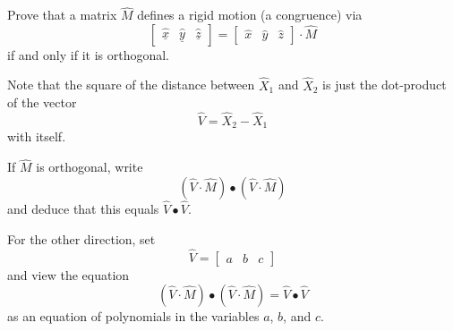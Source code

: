 \documentclass{ximera}
\begin{document}
\begin{problem}
  Prove that a matrix $\hat{M}$ defines a rigid motion (a congruence)
  via
  \[
\begin{bmatrix}
\underline{\hat{x}} & \underline{\hat{y}} & \underline{\hat{z}}%
\end{bmatrix}
=
\begin{bmatrix} \hat{x} & \hat{y} & \hat{z}%
\end{bmatrix}
\cdot\hat{M}
  \]
  if and only if it is orthogonal.

  \begin{hint}
    Note that the square of the distance between $\hat{X}_{1}$ and
    $\hat{X}_{2}$ is just the dot-product of the vector%
    \[
    \hat{V}=\hat{X}_{2}-\hat{X}_{1}%
    \]
    with itself. 
  \end{hint}
  \begin{hint}
    If $\hat{M}$ is orthogonal, write
    \[
    \left(  \hat{V}  \cdot\hat{M} \right) \bullet\left(
    \hat{V}  \cdot\hat{M}\right)
    \]
    and deduce that this equals $\hat{V}\bullet\hat{V}$. 
  \end{hint}
  \begin{hint} For the other direction, set
    \[
    \hat{V} =
    \begin{bmatrix}
      a & b & c
    \end{bmatrix}
    \]
    and view the equation 
    \[
    \left(  \hat{V}  \cdot\hat{M} \right) \bullet\left(
    \hat{V}  \cdot\hat{M}\right)  =\hat{V}\bullet\hat{V}
    \]
    as an equation of polynomials in the variables $a$, $b$, and $c$.
  \end{hint}
\end{problem}
\end{document}
